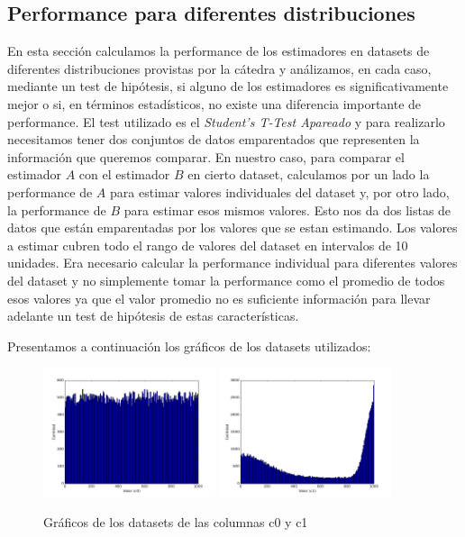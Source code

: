 \subsection{Performance para diferentes distribuciones}
En esta sección calculamos la performance de los estimadores en datasets de diferentes distribuciones provistas por la cátedra y análizamos, en cada caso, mediante un test de hipótesis, si alguno de los estimadores es significativamente mejor o si, en términos estadísticos, no existe una diferencia importante de performance. 
El test utilizado es el \textit{Student’s T-Test Apareado} y para realizarlo necesitamos tener dos conjuntos de datos emparentados que representen la información que queremos comparar. En nuestro caso, para comparar el estimador $A$ con el estimador $B$ en cierto dataset, calculamos por un lado la performance de $A$ para estimar valores individuales del dataset y, por otro lado, la performance de $B$ para estimar esos mismos valores. Esto nos da dos listas de datos que están emparentadas por los valores que se estan estimando. Los valores a estimar cubren todo el rango de valores del dataset en intervalos de 10 unidades. Era necesario calcular la performance individual para diferentes valores del dataset y no simplemente tomar la performance como el promedio de todos esos valores ya que el valor promedio no es suficiente información para llevar adelante un test de hipótesis de estas características.

Presentamos a continuación los gráficos de los datasets utilizados:

\begin{figure}[h!]
  \centering
  \includegraphics[width=0.45\textwidth]{./../source/datasets/img/c0}
  \includegraphics[width=0.45\textwidth]{./../source/datasets/img/c1}
  \caption{Gráficos de los datasets de las columnas c0 y c1}
 \end{figure}
 
